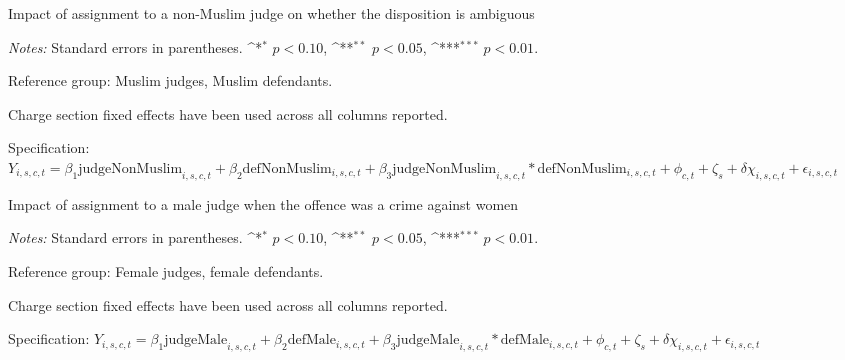 \documentclass[12pt,english]{article}
\def\sym#1{\ifmmode^{#1}\else\(^{#1}\)\fi}
\begin{document}
\begin{appendices}
\begin{landscape}
\begin{table}
  \begin{center}
     \caption{Impact of assignment to a non-Muslim judge on whether the disposition is ambiguous}
      \label{tab:robust_amb_Muslim}
     
    \end{center}
    \begin{minipage}{1.6\textwidth}
        \footnotesize 
        \emph{Notes:} Standard errors in parentheses. \sym{*} \(p<0.10\), \sym{**} \(p<0.05\), \sym{***} \(p<0.01\).  \par 
        Reference group: Muslim judges, Muslim defendants.  \par
        Charge section fixed effects have been used across all columns reported. \par
        Specification: $Y_{i,s,c,t} = \beta_{1} \text{judgeNonMuslim}_{i,s,c,t} + \beta_{2} \text{defNonMuslim}_{i,s,c,t} + \beta_{3} \text{judgeNonMuslim}_{i,s,c,t} * \text{defNonMuslim}_{i,s,c,t} + \phi_{c,t} + \zeta_{s} + \delta \chi_{i,s,c,t} + \epsilon_{i,s,c,t}$  \par
   \end{minipage}
\end{table}

\begin{table}[ht!]
      \begin{center}
        \caption{Impact of assignment to a male judge when the offence was a crime against women}
        \label{tab:crime_women}
        
      \end{center}
    \begin{minipage}{1.6\textwidth}
        \footnotesize 
        \emph{Notes:} Standard errors in parentheses. \sym{*} \(p<0.10\), \sym{**} \(p<0.05\), \sym{***} \(p<0.01\).  \par 
        Reference group: Female judges, female defendants.  \par
        Charge section fixed effects have been used across all columns reported. \par
        Specification: $Y_{i,s,c,t} = \beta_{1} \text{judgeMale}_{i,s,c,t} + \beta_{2} \text{defMale}_{i,s,c,t} + \beta_{3} \text{judgeMale}_{i,s,c,t} * \text{defMale}_{i,s,c,t} + \phi_{c,t} + \zeta_{s} + \delta \chi_{i,s,c,t} + \epsilon_{i,s,c,t}$ \par
   \end{minipage}
\end{table}


\end{landscape}
\end{appendices}
\end{document}
